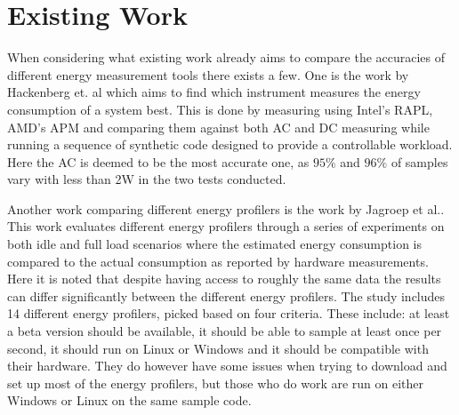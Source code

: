 
\section{Existing Work}

When considering what existing work already aims to compare the accuracies of different energy measurement tools there exists a few. One is the work by Hackenberg et. al\cite[]{Hackenberg2013} which aims to find which instrument measures the energy consumption of a system best. This is done by measuring using Intel's RAPL, AMD's APM and comparing them against both AC and DC measuring while running a sequence of synthetic code designed to provide a controllable workload. Here the AC is deemed to be the most accurate one, as $95\%$ and $96\%$ of samples vary with less than 2W in the two tests conducted.

Another work comparing different energy profilers is the work by Jagroep et al.\cite[]{Jagroep2015}. This work evaluates different energy profilers through a series of experiments on both idle and full load scenarios where the estimated energy consumption is compared to the actual consumption as reported by hardware measurements. Here it is noted that despite having access to roughly the same data the results can differ significantly between the different energy profilers. The study includes 14 different energy profilers, picked based on four criteria. These include: at least a beta version should be available, it should be able to sample at least once per second, it should run on Linux or Windows and it should be compatible with their hardware. They do however have some issues when trying to download and set up most of the energy profilers, but those who do work are run on either Windows or Linux on the same sample code.


